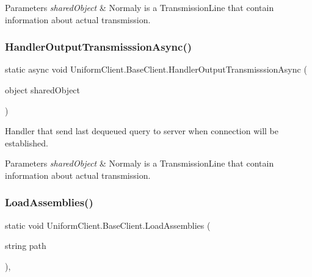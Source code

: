 \begin{DoxyParams}{Parameters}
{\em shared\+Object} & Normaly is a Transmission\+Line that contain information about actual transmission.\\
\hline
\end{DoxyParams}
\mbox{\label{class_uniform_client_1_1_base_client_a233b9fc7f1cdc4df399115938afd917d}} 
\subsubsection{\texorpdfstring{Handler\+Output\+Transmisssion\+Async()}{HandlerOutputTransmisssionAsync()}}
{\footnotesize\ttfamily static async void Uniform\+Client.\+Base\+Client.\+Handler\+Output\+Transmisssion\+Async (\begin{DoxyParamCaption}\item[{object}]{shared\+Object }\end{DoxyParamCaption})\hspace{0.3cm}{\ttfamily [static]}}



Handler that send last dequeued query to server when connection will be established. 


\begin{DoxyParams}{Parameters}
{\em shared\+Object} & Normaly is a Transmission\+Line that contain information about actual transmission.\\
\hline
\end{DoxyParams}
\mbox{\label{class_uniform_client_1_1_base_client_a8abbd1d46cc50556eeae8bbd55ce680f}} 
\subsubsection{\texorpdfstring{Load\+Assemblies()}{LoadAssemblies()}}
{\footnotesize\ttfamily static void Uniform\+Client.\+Base\+Client.\+Load\+Assemblies (\begin{DoxyParamCaption}\item[{string}]{path }\end{DoxyParamCaption})\hspace{0.3cm}{\ttfamily [static]}, {\ttfamily [protected]}}



